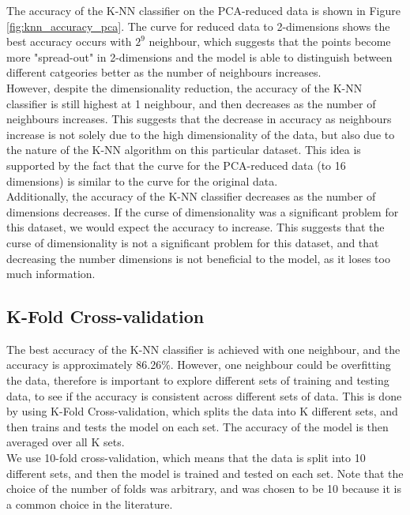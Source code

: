 \documentclass[12pt]{article}
\begin{document}
The accuracy of the K-NN classifier on the PCA-reduced data is shown in Figure \ref{fig:knn_accuracy_pca}. 
The curve for reduced data to 2-dimensions shows the best accuracy occurs with $2^9$ neighbour, which suggests that the points become more "spread-out" in 2-dimensions and the model is able to distinguish between different catgeories better as the number of neighbours increases. 
\\
However, despite the dimensionality reduction, the accuracy of the K-NN classifier is still highest at 1 neighbour, and then decreases as the number of neighbours increases. This suggests that the decrease in accuracy as neighbours increase is not solely due to the high dimensionality of the data, but also due to the nature of the K-NN algorithm on this particular dataset. This idea is supported by the fact that the curve for the PCA-reduced data (to 16 dimensions) is similar to the curve for the original data. 
\\
Additionally, the accuracy of the K-NN classifier decreases as the number of dimensions decreases. If the curse of dimensionality was a significant problem for this dataset, we would expect the accuracy to increase. This suggests that the curse of dimensionality is not a significant problem for this dataset, and that decreasing the number dimensions is not beneficial to the model, as it loses too much information.

\vspace{20pt}

\subsection{K-Fold Cross-validation}
\noindent
The best accuracy of the K-NN classifier is achieved with one neighbour, and the accuracy is approximately 86.26\%. However, one neighbour could be overfitting the data, therefore is important to explore different sets of training and testing data, to see if the accuracy is consistent across different sets of data. This is done by using K-Fold Cross-validation, which splits the data into K different sets, and then trains and tests the model on each set. The accuracy of the model is then averaged over all K sets. 
\\
We use 10-fold cross-validation, which means that the data is split into 10 different sets, and then the model is trained and tested on each set. Note that the choice of the number of folds was arbitrary, and was chosen to be 10 because it is a common choice in the literature.
\\
\end{document}
